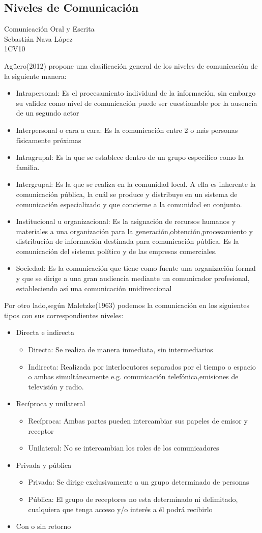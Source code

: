 \documentclass[a4paper,11pt]{article}
\newcommand{\titlehomework}[4]{\begin{center}\section*{#4}{\large #2}\\#1\\#3\\[1.5ex]\end{center}}
\begin{document}
\titlehomework{Sebastián Nava López}{Comunicación Oral y Escrita}{1CV10}{Niveles de Comunicación}
Agüero(2012) propone una clasificación general de los niveles de comunicación de la siguiente manera:
\begin{itemize}
\item Intrapersonal: Es el procesamiento individual de la información, sin embargo su validez como nivel de comunicación puede ser cuestionable por la ausencia de un segundo actor
\item Interpersonal o cara a cara: Es la comunicación entre 2 o más personas físicamente próximas
\item Intragrupal: Es la que se establece dentro de un grupo específico como la familia.
\item Intergrupal: Es la que se realiza en la comunidad local. A ella es inherente la comunicación pública, la cuál se produce y distribuye en un sistema de comunicación especializado y que concierne a la comunidad en conjunto.
\item Institucional u organizacional: Es la asignación de recursos humanos y materiales a una organización para la generación,obtención,procesamiento y distribución de información destinada para comunicación pública. Es la comunicación del sistema político y de las empresas comerciales.
\item Sociedad: Es la comunicación que tiene como fuente una organización formal y que se dirige a una gran audiencia mediante un comunicador profesional, estableciendo así una comunicación unidireccional
\end{itemize}
Por otro lado,según Maletzke(1963) podemos la comunicación en  los siguientes tipos con sus correspondientes niveles:
\begin{itemize}
\item Directa e indirecta
\begin{itemize}
\item Directa: Se realiza de manera inmediata, sin intermediarios	
\item Indirecta: Realizada por interlocutores separados por el tiempo o espacio o ambas simultáneamente e.g. comunicación telefónica,emisiones de televisión y radio.
\end{itemize}
\item Recíproca y unilateral
\begin{itemize}
\item Recíproca: Ambas partes pueden intercambiar sus papeles de emisor y receptor
\item Unilateral: No se intercambian los roles de los comunicadores
\end{itemize}
\item Privada y pública
\begin{itemize}
\item Privada: Se dirige exclusivamente a un grupo determinado de personas
\item Pública: El grupo de receptores no esta determinado ni delimitado, cualquiera que tenga acceso y/o interés a él podrá recibirlo
\end{itemize}
\item Con o sin retorno
\end{itemize}
\end{document}
